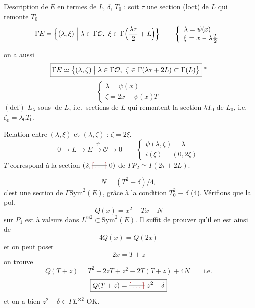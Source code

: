 \documentclass[11pt,a4paper]{article}
\begin{document}
Description de $E$ en termes de $L$, $\delta$, $T_{0}$ : soit $\tau$ une section (loct) de $L$ qui remonte $T_{0}$
\[
  \Gamma E = \Bigl\{ (\lambda, \xi) \Bigm| \lambda \in \Gamma \mathcal{O},\ \xi \in \Gamma\Bigl(\frac{\lambda\tau}{2} + L\Bigr) \Bigr\}
  \qquad
  \left\{\begin{array}{l} \lambda = \psi(x) \\ \xi = x - \lambda\frac{T}{2} \end{array}\right.
\]

on a aussi
\[
  \boxed{\Gamma E \simeq \bigl\{ (\lambda, \zeta) \bigm| \lambda \in \Gamma \mathcal{O},\ \zeta \in \Gamma(\lambda\tau + 2L) \subset \Gamma(L) \bigr\}}\ {}^{\ast}
\]
\[
  \boxed{\left\{\begin{array}{l} \lambda = \psi(x) \\ \zeta = 2x - \psi(x)T \end{array}\right.}
\]
$(\mathrm{d\acute{e}f})$ $L_{\lambda}$ sous-\struck{\ill{}} de $L$, i.e.\ sections de $L$ qui remontent la section $\lambda T_{0}$ de $L_{0}$, i.e.\ $\boxed{\zeta_{0} = \lambda_{0}T_{0}}$.

Relation entre $(\lambda, \xi)$ et $(\lambda, \zeta)$ : $\zeta = 2\xi$.
\[
  0 \to L \longrightarrow E \xrightarrow{\ \psi\ } \mathcal{O} \to 0
  \qquad
  \left\{\begin{array}{l} \psi(\lambda, \zeta) = \lambda \\ i(\xi) = (0, 2\xi) \end{array}\right.
\]
$T$ correspond à la section $(2, \text{\struck{\ill{}}}\ 0)$ de $\Gamma P_{2} \simeq \Gamma(2\tau + 2L)$.

\[
  N = (T^{2} - \delta)/4,
\]
c'est une section de $\Gamma \mathrm{Sym}^{2}(E)$, grâce à la condition $T_{0}^{2} \equiv \delta$ (4). Vérifions que la  pol.
\[
  Q(x) = x^{2} - Tx + N
\]
sur $P_{1}$ est à valeurs dans $L^{\otimes 2} \subset \mathrm{Sym}^{2}(E)$. Il suffit de prouver qu'il en est ainsi de
\[
  4Q(x) = Q(2x)
\]
et on peut poser
\[
  2x = T + z
\]
on trouve
\[
  Q(T + z) = T^{2} + 2zT + z^{2} - 2T(T + z) + 4N
  \qquad\text{i.e.}
\]
\[
  \boxed{Q(T + z) = \text{\struck{\ill{}}}\ z^{2} - \delta}
\]
et on a bien $z^{2} - \delta \in \Gamma L^{\otimes 2}$ \quad OK.
\end{document}
